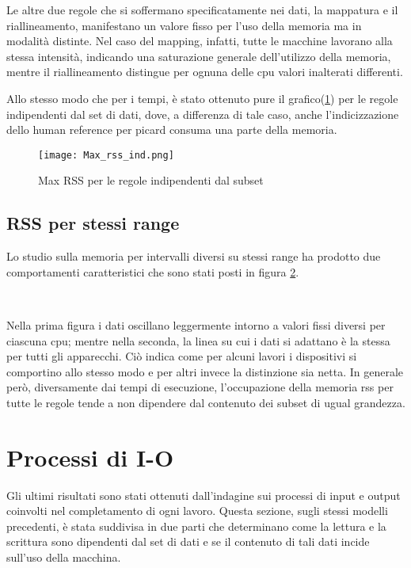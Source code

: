 Le altre due regole che si soffermano specificatamente nei dati, la mappatura e il riallineamento, manifestano un valore fisso per l'uso della memoria ma in modalità distinte.
Nel caso del mapping, infatti, tutte le macchine lavorano alla stessa intensità, indicando una saturazione generale dell'utilizzo della memoria, mentre il riallineamento distingue per ognuna delle cpu valori inalterati differenti. 

Allo stesso modo che per i tempi, è stato ottenuto pure il grafico(\ref{fig:RSSind}) per le regole indipendenti dal set di dati, dove, a differenza di tale caso, anche l'indicizzazione dello human reference per picard consuma una parte della memoria.

\begin{figure}[H]
\centering
\texttt{[image: Max\_rss\_ind.png]}
\caption{Max RSS per le regole indipendenti dal subset}
\label{fig:RSSind}
\end{figure}

\subsection{RSS per stessi range}
Lo studio sulla memoria per intervalli diversi su stessi range ha prodotto due comportamenti caratteristici che sono stati posti in figura \ref{fig:RSSrng}.
\begin{figure}[H]
\centering
{} \quad
{} \\
\caption{}
\label{fig:RSSrng}
\end{figure}

Nella prima figura i dati oscillano leggermente intorno a valori fissi diversi per ciascuna cpu; mentre nella seconda, la linea su cui i dati si adattano è la stessa per tutti gli apparecchi.
Ciò indica come per alcuni lavori i dispositivi si comportino allo stesso modo e per altri invece la distinzione sia netta. 
In generale però, diversamente dai tempi di esecuzione, l'occupazione della memoria rss  per tutte le regole tende a non dipendere dal contenuto dei subset di ugual grandezza.

\section{Processi di I-O} 
Gli ultimi risultati sono stati ottenuti dall'indagine sui processi di input e output coinvolti nel completamento di ogni lavoro.
Questa sezione, sugli stessi modelli precedenti, è stata suddivisa in due parti che determinano come la lettura e la scrittura sono dipendenti dal set di dati e se il contenuto di tali dati incide sull'uso della macchina.

